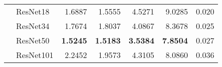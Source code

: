 \begin{table*}[!t]
\begin{tabular}{|cl|rr|rr|r|}
\multicolumn{1}{|c|}{}                                                                               & ResNet18                   & \multicolumn{1}{r|}{1.6887}                                                                                  & 1.5555                                                                                                        & \multicolumn{1}{r|}{4.5271}                                                                                  & 9.0285                                                                                                        & 0.020                                                                                                                           \\ \cline{2-7} 
\multicolumn{1}{|c|}{}                                                                               & ResNet34                   & \multicolumn{1}{r|}{1.7674}                                                                                  & 1.8037                                                                                                        & \multicolumn{1}{r|}{4.0867}                                                                                  & 8.3678                                                                                                        & 0.025                                                                                                                           \\ \cline{2-7} 
\multicolumn{1}{|c|}{}                                                                               & ResNet50                   & \multicolumn{1}{r|}{\textbf{1.5245}}                                                                         & \textbf{1.5183}                                                                                               & \multicolumn{1}{r|}{\textbf{3.5384}}                                                                         & \textbf{7.8504}                                                                                               & 0.027                                                                                                                           \\ \cline{2-7} 
\multicolumn{1}{|c|}{}                                                                               & ResNet101                  & \multicolumn{1}{r|}{2.2452}                                                                                  & 1.9573                                                                                                        & \multicolumn{1}{r|}{4.3105}                                                                                  & 8.0860                                                                                                        & 0.036                                                                                                                           \\ \cline{2-7} 

\end{tabular}
\end{table*}
